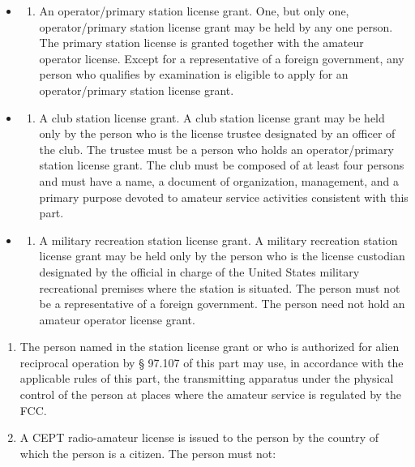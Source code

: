 \documentclass[
  letterpaper,
  DIV=11,
  numbers=noendperiod]{scrreport}
\providecommand{\tightlist}{%
  \setlength{\itemsep}{0pt}\setlength{\parskip}{0pt}}\usepackage{longtable,booktabs,array}
\begin{document}
\begin{itemize}
\item
  \begin{enumerate}
  \def\labelenumi{(\arabic{enumi})}
  \tightlist
  \item
    An operator/primary station license grant. One, but only one,
    operator/primary station license grant may be held by any one
    person. The primary station license is granted together with the
    amateur operator license. Except for a representative of a foreign
    government, any person who qualifies by examination is eligible to
    apply for an operator/primary station license grant.
  \end{enumerate}
\item
  \begin{enumerate}
  \def\labelenumi{(\arabic{enumi})}
  \setcounter{enumi}{1}
  \tightlist
  \item
    A club station license grant. A club station license grant may be
    held only by the person who is the license trustee designated by an
    officer of the club. The trustee must be a person who holds an
    operator/primary station license grant. The club must be composed of
    at least four persons and must have a name, a document of
    organization, management, and a primary purpose devoted to amateur
    service activities consistent with this part.
  \end{enumerate}
\item
  \begin{enumerate}
  \def\labelenumi{(\arabic{enumi})}
  \setcounter{enumi}{2}
  \tightlist
  \item
    A military recreation station license grant. A military recreation
    station license grant may be held only by the person who is the
    license custodian designated by the official in charge of the United
    States military recreational premises where the station is situated.
    The person must not be a representative of a foreign government. The
    person need not hold an amateur operator license grant.
  \end{enumerate}
\end{itemize}

\begin{enumerate}
\def\labelenumi{(\alph{enumi})}
\setcounter{enumi}{2}
\item
  The person named in the station license grant or who is authorized for
  alien reciprocal operation by § 97.107 of this part may use, in
  accordance with the applicable rules of this part, the transmitting
  apparatus under the physical control of the person at places where the
  amateur service is regulated by the FCC.
\item
  A CEPT radio-amateur license is issued to the person by the country of
  which the person is a citizen. The person must not:
\end{enumerate}
\end{document}
